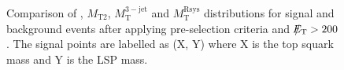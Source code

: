 \begin{figure}[!t]
  \centering
{}
  \caption{Comparison of \met, $M_\mathrm{T2}$, $M_\mathrm{T}^\mathrm{3-jet}$ and $M_\mathrm{T}^\mathrm{Rsys}$ distributions for signal and background events after applying pre-selection criteria and $\slash\mkern-12mu{E}_{\text{T}} > 200$\gev. The signal points are labelled as (X, Y) where X is the top squark mass and Y is the LSP mass.}
  \label{fig:stop_ref_plots}
\end{figure} 
